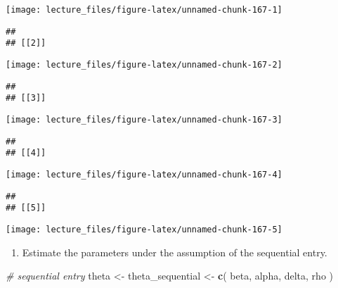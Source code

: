 \documentclass[
]{book}
\newenvironment{Shaded}{\begin{snugshade}}{\end{snugshade}}
\newcommand{\CommentTok}[1]{\textcolor[rgb]{0.56,0.35,0.01}{\textit{#1}}}
\newcommand{\FunctionTok}[1]{\textcolor[rgb]{0.13,0.29,0.53}{\textbf{#1}}}
\newcommand{\NormalTok}[1]{#1}
\newcommand{\OtherTok}[1]{\textcolor[rgb]{0.56,0.35,0.01}{#1}}
\providecommand{\tightlist}{%
  \setlength{\itemsep}{0pt}\setlength{\parskip}{0pt}}
\begin{document}
\begin{center}\texttt{[image: lecture\_files/figure-latex/unnamed-chunk-167-1]} \end{center}

\begin{verbatim}
## 
## [[2]]
\end{verbatim}

\begin{center}\texttt{[image: lecture\_files/figure-latex/unnamed-chunk-167-2]} \end{center}

\begin{verbatim}
## 
## [[3]]
\end{verbatim}

\begin{center}\texttt{[image: lecture\_files/figure-latex/unnamed-chunk-167-3]} \end{center}

\begin{verbatim}
## 
## [[4]]
\end{verbatim}

\begin{center}\texttt{[image: lecture\_files/figure-latex/unnamed-chunk-167-4]} \end{center}

\begin{verbatim}
## 
## [[5]]
\end{verbatim}

\begin{center}\texttt{[image: lecture\_files/figure-latex/unnamed-chunk-167-5]} \end{center}

\begin{enumerate}
\def\labelenumi{\arabic{enumi}.}
\setcounter{enumi}{5}
\tightlist
\item
  Estimate the parameters under the assumption of the sequential entry.
\end{enumerate}

\begin{Shaded}
\begin{Highlighting}[]
\CommentTok{\# sequential entry}
\NormalTok{theta }\OtherTok{\textless{}{-}} 
\NormalTok{  theta\_sequential }\OtherTok{\textless{}{-}}
  \FunctionTok{c}\NormalTok{(}
\NormalTok{    beta, }
\NormalTok{    alpha, }
\NormalTok{    delta, }
\NormalTok{    rho}
\NormalTok{    )}
\end{Highlighting}
\end{Shaded}
\end{document}
